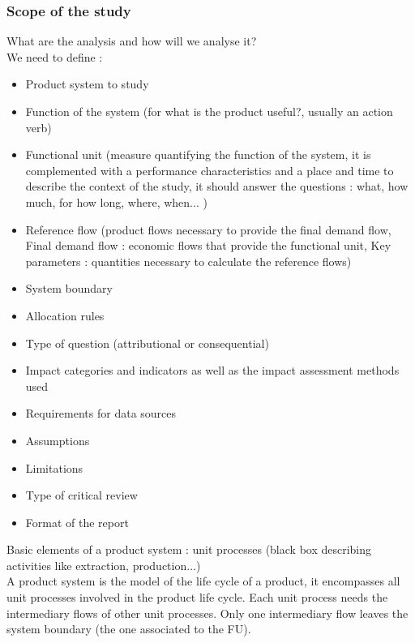 \documentclass[../main.tex]{subfiles}
\begin{document}
\subsubsection{Scope of the study}
What are the analysis and how will we analyse it? \\
We need to define : \begin{itemize}
    \item Product system to study
    \item Function of the system (for what is the product useful?, usually an action verb)
    \item Functional unit (measure quantifying the function of the system, it is complemented with a performance characteristics and a place and time to describe the context of the study, it should answer the questions : what, how much, for how long, where, when... )
    \item Reference flow (product flows necessary to provide the final demand flow, Final demand flow : economic flows that provide the functional unit, Key parameters : quantities necessary to calculate the reference flows)
    \item System boundary
    \item Allocation rules
    \item Type of question (attributional or consequential)
    \item Impact categories and indicators as well as the impact assessment methods used
    \item Requirements for data sources
    \item Assumptions
    \item Limitations
    \item Type of critical review
    \item Format of the report
\end{itemize}

Basic elements of a product system : unit processes (black box describing activities like extraction, production...)\\

A product system is the model of the life cycle of a product, it encompasses all unit processes involved in the product life cycle. Each unit process needs the intermediary flows of other unit processes. Only one intermediary flow leaves the system boundary (the one associated to the FU).\\
\end{document}
